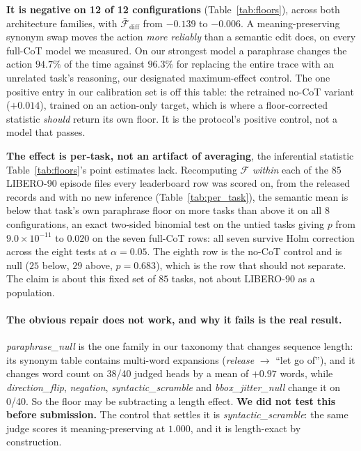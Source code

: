 \documentclass[11pt]{article}
\begin{document}
\textbf{It is negative on 12 of 12 configurations} (Table~\ref{tab:floors}), across both architecture families, with $\bar{\mathcal{F}}_{\text{diff}}$ from $-0.139$ to $-0.006$. A meaning-preserving synonym swap moves the action \emph{more reliably} than a semantic edit does, on every full-CoT model we measured. On our strongest model a paraphrase changes the action $94.7\%$ of the time against $96.3\%$ for replacing the entire trace with an unrelated task's reasoning, our designated maximum-effect control. The one positive entry in our calibration set is off this table: the retrained no-CoT variant ($+0.014$), trained on an action-only target, which is where a floor-corrected statistic \emph{should} return its own floor. It is the protocol's positive control, not a model that passes.

\textbf{The effect is per-task, not an artifact of averaging}, the inferential statistic Table~\ref{tab:floors}'s point estimates lack. Recomputing $\mathcal{F}$ \emph{within} each of the $85$ LIBERO-90 \citep{libero} episode files every leaderboard row was scored on, from the released records and with no new inference (Table~\ref{tab:per_task}), the semantic mean is below that task's own paraphrase floor on more tasks than above it on all $8$ configurations, an exact two-sided binomial test on the untied tasks giving $p$ from $9.0{\times}10^{-11}$ to $0.020$ on the seven full-CoT rows: all seven survive Holm correction across the eight tests at $\alpha{=}0.05$. The eighth row is the no-CoT control and is null ($25$ below, $29$ above, $p = 0.683$), which is the row that should not separate. The claim is about this fixed set of $85$ tasks, not about LIBERO-90 as a population.

\paragraph{The obvious repair does not work, and why it fails is the real result.} \emph{paraphrase\_null} is the one family in our taxonomy that changes sequence length: its synonym table contains multi-word expansions (\emph{release} $\to$ ``let go of''), and it changes word count on 38/40 judged heads by a mean of $+0.97$ words, while \emph{direction\_flip}, \emph{negation}, \emph{syntactic\_scramble} and \emph{bbox\_jitter\_null} change it on 0/40. So the floor may be subtracting a length effect. \textbf{We did not test this before submission.} The control that settles it is \emph{syntactic\_scramble}: the same judge scores it meaning-preserving at $1.000$, and it is length-exact by construction.
\end{document}
